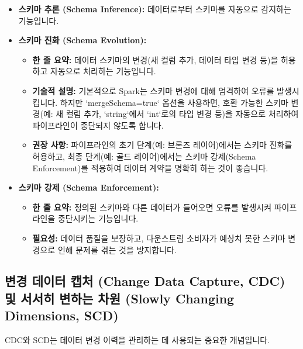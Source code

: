 \documentclass[11pt,a4paper]{article}
\begin{document}
\begin{itemize}
    \item \textbf{스키마 추론 (Schema Inference):} 데이터로부터 스키마를 자동으로 감지하는 기능입니다.
    \item \textbf{스키마 진화 (Schema Evolution):}
    \begin{itemize}
        \item \textbf{한 줄 요약:} 데이터 스키마의 변경(새 컬럼 추가, 데이터 타입 변경 등)을 허용하고 자동으로 처리하는 기능입니다.
        \item \textbf{기술적 설명:} 기본적으로 Spark는 스키마 변경에 대해 엄격하여 오류를 발생시킵니다. 하지만 `mergeSchema=true` 옵션을 사용하면, 호환 가능한 스키마 변경(예: 새 컬럼 추가, `string`에서 `int`로의 타입 변경 등)을 자동으로 처리하여 파이프라인이 중단되지 않도록 합니다.
        \item \textbf{권장 사항:} 파이프라인의 초기 단계(예: 브론즈 레이어)에서는 스키마 진화를 허용하고, 최종 단계(예: 골드 레이어)에서는 스키마 강제(Schema Enforcement)를 적용하여 데이터 계약을 명확히 하는 것이 좋습니다.
    \end{itemize}
    \item \textbf{스키마 강제 (Schema Enforcement):}
    \begin{itemize}
        \item \textbf{한 줄 요약:} 정의된 스키마와 다른 데이터가 들어오면 오류를 발생시켜 파이프라인을 중단시키는 기능입니다.
        \item \textbf{필요성:} 데이터 품질을 보장하고, 다운스트림 소비자가 예상치 못한 스키마 변경으로 인해 문제를 겪는 것을 방지합니다.
    \end{itemize}
\end{itemize}

\subsection{변경 데이터 캡처 (Change Data Capture, CDC) 및 서서히 변하는 차원 (Slowly Changing Dimensions, SCD)}
CDC와 SCD는 데이터 변경 이력을 관리하는 데 사용되는 중요한 개념입니다.
\end{document}
